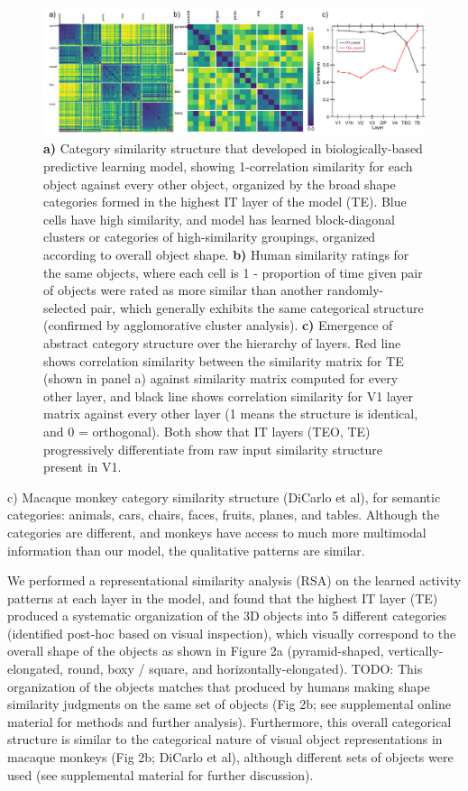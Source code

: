\documentclass[11pt,twoside]{article}
\newif\myifpdf
\begin{document}
\begin{figure}
  \centering\includegraphics[width=6in]{fig_rsa_leabra_expt1}
  \caption{\small {\bf a)} Category similarity structure that developed in biologically-based predictive learning model, showing 1-correlation similarity for each object against every other object, organized by the broad shape categories formed in the highest IT layer of the model (TE). Blue cells have high similarity, and model has learned block-diagonal clusters or categories of high-similarity groupings, organized according to overall object shape. {\bf b)} Human similarity ratings for the same objects, where each cell is 1 - proportion of time given pair of objects were rated as more similar than another randomly-selected pair, which generally exhibits the same categorical structure (confirmed by agglomorative cluster analysis).  {\bf c)} Emergence of abstract category structure over the hierarchy of layers.  Red line shows correlation similarity between the similarity matrix for TE (shown in panel a) against similarity matrix computed for every other layer, and black line shows correlation similarity for V1 layer matrix against every other layer (1 means the structure is identical, and 0 = orthogonal). Both show that IT layers (TEO, TE) progressively differentiate from raw input similarity structure present in V1.}
  \label{fig.rsa}
\end{figure}



c) Macaque monkey category similarity structure (DiCarlo et al), for semantic categories: animals, cars, chairs, faces, fruits, planes, and tables. Although the categories are different, and monkeys have access to much more multimodal information than our model, the qualitative patterns are similar.

We performed a representational similarity analysis (RSA) on the learned activity patterns at each layer in the model, and found that the highest IT layer (TE) produced a systematic organization of the 3D objects into 5 different categories (identified post-hoc based on visual inspection), which visually correspond to the overall shape of the objects as shown in Figure 2a (pyramid-shaped, vertically-elongated, round, boxy / square, and horizontally-elongated). TODO: This organization of the objects matches that produced by humans making shape similarity judgments on the same set of objects (Fig 2b; see supplemental online material for methods and further analysis).  Furthermore, this overall categorical structure is similar to the categorical nature of visual object representations in macaque monkeys (Fig 2b; DiCarlo et al), although different sets of objects were used (see supplemental material for further discussion).
\end{document}
